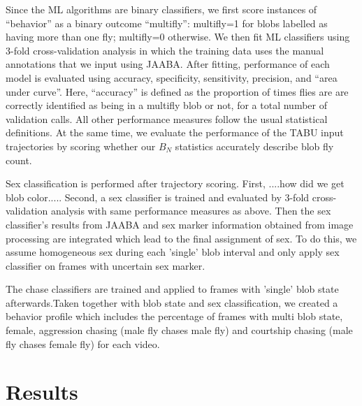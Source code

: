 \documentclass[11pt]{article}
\begin{document}
{Since the ML algorithms are binary classifiers, we first score instances of ``behavior'' as a binary outcome ``multifly'': multifly=1 for blobs labelled as having more than one fly; multifly=0 otherwise. We then fit ML classifiers using 3-fold cross-validation analysis in which the training data uses the manual annotations that we input using JAABA. After fitting, performance of each model is evaluated using accuracy, specificity, sensitivity, precision, and ``area under curve''. Here, ``accuracy'' is defined as the proportion of times flies are are correctly identified as being in a multifly blob or not, for a total number of validation calls. All other performance measures follow the usual statistical definitions. At the same time, we evaluate the performance of the TABU input trajectories by scoring whether our $B_N$ statistics accurately describe blob fly count. 

Sex classification is performed after trajectory scoring. First, ....how did we get blob color..... Second, a sex classifier is trained and evaluated by 3-fold cross-validation analysis with same performance measures as above. Then the sex classifier's results from JAABA and sex marker information obtained from image processing are integrated which lead to the final assignment of sex. To do this, we assume homogeneous sex during each 'single' blob interval and only apply sex classifier on frames with uncertain sex marker. 

The chase classifiers are trained and applied to frames with 'single' blob state afterwards.Taken together with blob state and sex classification, we created a behavior profile which includes the percentage of frames with multi blob state, female, aggression chasing (male fly chases male fly) and courtship chasing (male fly chases female fly) for each video.

\vspace*{-0.15in}
\section*{Results}\label{s:results}

}
\end{document}
